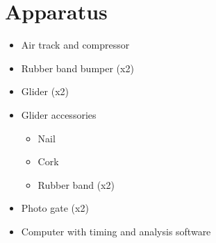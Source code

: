 \section*{Apparatus}

\begin{itemize}
    \item Air track and compressor
    \item Rubber band bumper (x2)
    \item Glider (x2)
    \item Glider accessories
    \begin{itemize}
        \item Nail
        \item Cork
        \item Rubber band (x2)
    \end{itemize}
    \item Photo gate (x2)
    \item Computer with timing and analysis software
\end{itemize}
